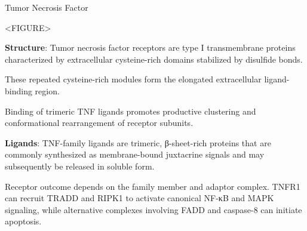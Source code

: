     \begin{core}[label=core:tnf]{Tumor Necrosis Factor}

      <FIGURE>

      \textbf{Structure}: Tumor necrosis factor receptors are type I transmembrane proteins characterized by extracellular cysteine-rich domains stabilized by disulfide bonds.

      These repeated cysteine-rich modules form the elongated extracellular ligand-binding region.

      Binding of trimeric TNF ligands promotes productive clustering and conformational rearrangement of receptor subunits.

      \textbf{Ligands}: TNF-family ligands are trimeric, β-sheet-rich proteins that are commonly synthesized as membrane-bound juxtacrine signals and may subsequently be released in soluble form.

      Receptor outcome depends on the family member and adaptor complex. TNFR1 can recruit TRADD and RIPK1 to activate canonical NF-κB and MAPK signaling, while alternative complexes involving FADD and caspase-8 can initiate apoptosis.

    \end{core}


